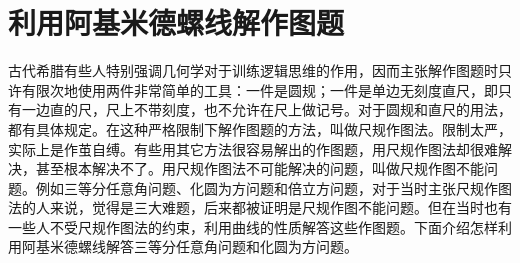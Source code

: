 \section{利用阿基米德螺线解作图题}

古代希腊有些人特别强调几何学对于训练逻辑思维的作用，因而主张解作图题时只许有限次地使用两件非常简单的工具：一件是圆规；一件是单边无刻度直尺，即只有一边直的尺，尺上不带刻度，也不允许在尺上做记号。对于圆规和直尺的用法，都有具体规定。在这种严格限制下解作图题的方法，叫做尺规作图法。限制太严，实际上是作茧自缚。有些用其它方法很容易解出的作图题，用尺规作图法却很难解决，甚至根本解决不了。用尺规作图法不可能解决的问题，叫做尺规作图不能问题。例如三等分任意角问题、化圆为方问题和倍立方问题，对于当时主张尺规作图法的人来说，觉得是三大难题，后来都被证明是尺规作图不能问题。但在当时也有一些人不受尺规作图法的约束，利用曲线的性质解答这些作图题。下面介绍怎样利用阿基米德螺线解答三等分任意角问题和化圆为方问题。

